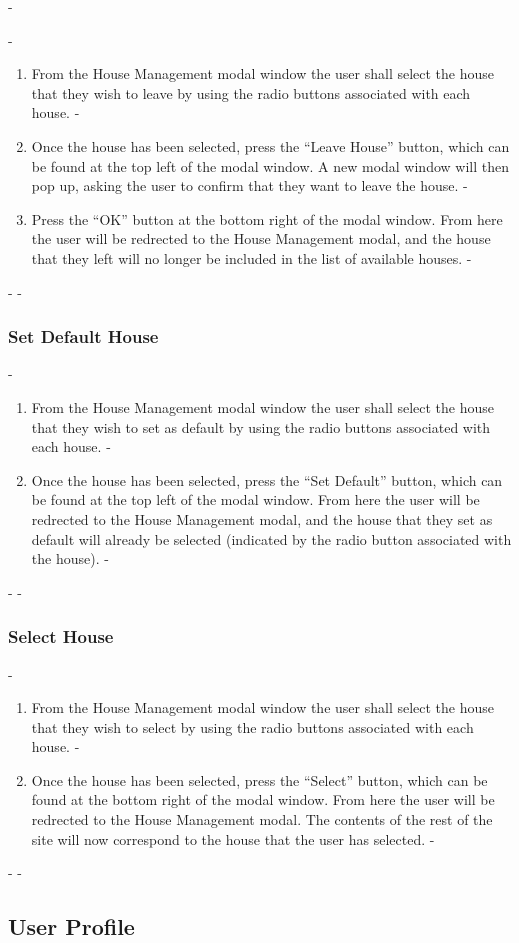-\documentclass[12pt]{article}
\begin{document}
 -\begin{enumerate}
 -\item From the House Management modal window the user shall select the house that they wish to leave by using the radio buttons associated with each house.
 -\item Once the house has been selected, press the ``Leave House'' button, which can be found at the top left of the modal window. A new modal window will then pop up, asking the user to confirm that they want to leave the house.
 -\item Press the ``OK'' button at the bottom right of the modal window. From here the user will be redrected to the House Management modal, and the house that they left will no longer be included in the list of available houses.
 -\end{enumerate}
 -
 -\subsubsection{Set Default House}
 -\begin{enumerate}
 -\item From the House Management modal window the user shall select the house that they wish to set as default by using the radio buttons associated with each house.
 -\item Once the house has been selected, press the ``Set Default'' button, which can be found at the top left of the modal window. From here the user will be redrected to the House Management modal, and the house that they set as default will already be selected (indicated by the radio button associated with the house).
 -\end{enumerate}
 -
 -\subsubsection{Select House}
 -\begin{enumerate}
 -\item From the House Management modal window the user shall select the house that they wish to select by using the radio buttons associated with each house.
 -\item Once the house has been selected, press the ``Select'' button, which can be found at the bottom right of the modal window. From here the user will be redrected to the House Management modal. The contents of the rest of the site will now correspond to the house that the user has selected.
 -\end{enumerate}
 -
 -\subsection{User Profile} %
\end{document}
